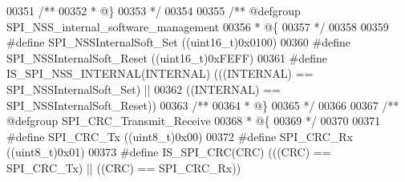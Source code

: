 \begin{DoxyCode}
00351 \textcolor{comment}{/**}
00352 \textcolor{comment}{  * @\}}
00353 \textcolor{comment}{  */}
00354 
00355 \textcolor{comment}{/** @defgroup SPI\_NSS\_internal\_software\_management }
00356 \textcolor{comment}{  * @\{}
00357 \textcolor{comment}{  */}
00358 
00359 \textcolor{preprocessor}{#}\textcolor{preprocessor}{define} \textcolor{preprocessor}{SPI\_NSSInternalSoft\_Set}         \textcolor{preprocessor}{(}\textcolor{preprocessor}{(}\textcolor{preprocessor}{uint16\_t}\textcolor{preprocessor}{)}0x0100\textcolor{preprocessor}{)}
00360 \textcolor{preprocessor}{#}\textcolor{preprocessor}{define} \textcolor{preprocessor}{SPI\_NSSInternalSoft\_Reset}       \textcolor{preprocessor}{(}\textcolor{preprocessor}{(}\textcolor{preprocessor}{uint16\_t}\textcolor{preprocessor}{)}0xFEFF\textcolor{preprocessor}{)}
00361 \textcolor{preprocessor}{#}\textcolor{preprocessor}{define} \textcolor{preprocessor}{IS\_SPI\_NSS\_INTERNAL}\textcolor{preprocessor}{(}\textcolor{preprocessor}{INTERNAL}\textcolor{preprocessor}{)} \textcolor{preprocessor}{(}\textcolor{preprocessor}{(}\textcolor{preprocessor}{(}\textcolor{preprocessor}{INTERNAL}\textcolor{preprocessor}{)} \textcolor{preprocessor}{==} 
      SPI_NSSInternalSoft_Set\textcolor{preprocessor}{)} \textcolor{preprocessor}{||}
00362                                        \textcolor{preprocessor}{(}\textcolor{preprocessor}{(}\textcolor{preprocessor}{INTERNAL}\textcolor{preprocessor}{)} \textcolor{preprocessor}{==} 
      SPI_NSSInternalSoft_Reset\textcolor{preprocessor}{)}\textcolor{preprocessor}{)}
00363 \textcolor{comment}{/**}
00364 \textcolor{comment}{  * @\}}
00365 \textcolor{comment}{  */}
00366 
00367 \textcolor{comment}{/** @defgroup SPI\_CRC\_Transmit\_Receive }
00368 \textcolor{comment}{  * @\{}
00369 \textcolor{comment}{  */}
00370 
00371 \textcolor{preprocessor}{#}\textcolor{preprocessor}{define} \textcolor{preprocessor}{SPI\_CRC\_Tx}                      \textcolor{preprocessor}{(}\textcolor{preprocessor}{(}\textcolor{preprocessor}{uint8\_t}\textcolor{preprocessor}{)}0x00\textcolor{preprocessor}{)}
00372 \textcolor{preprocessor}{#}\textcolor{preprocessor}{define} \textcolor{preprocessor}{SPI\_CRC\_Rx}                      \textcolor{preprocessor}{(}\textcolor{preprocessor}{(}\textcolor{preprocessor}{uint8\_t}\textcolor{preprocessor}{)}0x01\textcolor{preprocessor}{)}
00373 \textcolor{preprocessor}{#}\textcolor{preprocessor}{define} \textcolor{preprocessor}{IS\_SPI\_CRC}\textcolor{preprocessor}{(}\textcolor{preprocessor}{CRC}\textcolor{preprocessor}{)} \textcolor{preprocessor}{(}\textcolor{preprocessor}{(}\textcolor{preprocessor}{(}\textcolor{preprocessor}{CRC}\textcolor{preprocessor}{)} \textcolor{preprocessor}{==} SPI_CRC_Tx\textcolor{preprocessor}{)} \textcolor{preprocessor}{||} \textcolor{preprocessor}{(}\textcolor{preprocessor}{(}\textcolor{preprocessor}{CRC}\textcolor{preprocessor}{)} \textcolor{preprocessor}{==} SPI_CRC_Rx\textcolor{preprocessor}{)}\textcolor{preprocessor}{)}

\end{DoxyCode}
